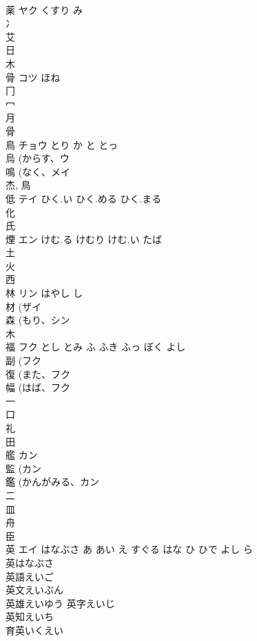 \documentclass[8pt]{extreport}
\begin{document}
\begin{CJK}{UTF8}{min}
\\	薬	ヤク	くすり み	
\\	冫 
\\	艾 
\\	日 
\\	木 
\\	骨	コツ	ほね	
\\	冂 
\\	冖 
\\	月 
\\	骨 
\\	鳥	チョウ	とり か と とっ	
\\	烏 (からす、ウ 
\\	鳴 (なく、メイ 
\\	杰, 鳥 
\\	低	テイ	ひく.い ひく.める ひく.まる	
\\	化 
\\	氏 
\\	煙	エン	けむ.る けむり けむ.い たば	
\\	土 
\\	火 
\\	西 
\\	林	リン	はやし し	
\\	材 (ザイ 
\\	森 (もり、シン 
\\	木 
\\	福	フク	とし とみ ふ ふき ふっ ぼく よし	
\\	副 (フク 
\\	復 (また、フク 
\\	幅 (はば、フク 
\\	一 
\\	口 
\\	礼 
\\	田 
\\	艦	カン		
\\	監 (カン 
\\	鑑 (かんがみる、カン 
\\	二 
\\	皿 
\\	舟 
\\	臣 
\\	英	エイ	はなぶさ あ あい え すぐる はな ひ ひで よし ら	
\\	英はなぶさ 
\\	英語えいご 
\\	英文えいぶん 
\\	英雄えいゆう 英字えいじ 
\\	英知えいち 
\\	育英いくえい 

\end{CJK}
\end{document}
